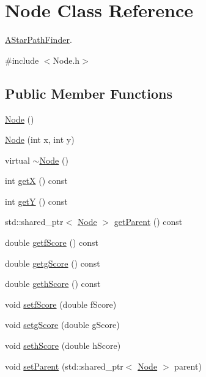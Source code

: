 \hypertarget{classNode}{}\section{Node Class Reference}
\label{classNode}


\hyperlink{classAStarPathFinder}{A\+Star\+Path\+Finder}.  




{\ttfamily \#include $<$Node.\+h$>$}

\subsection*{Public Member Functions}
\begin{DoxyCompactItemize}
\item 
\hyperlink{classNode_ad7a34779cad45d997bfd6d3d8043c75f}{Node} ()
\item 
\hyperlink{classNode_a23a19f53dfbb18fec58cdac90de3d144}{Node} (int x, int y)
\item 
virtual \hyperlink{classNode_aa0840c3cb5c7159be6d992adecd2097c}{$\sim$\+Node} ()
\item 
int \hyperlink{classNode_aa45b6294ee8c7aafdf5a1450f879c598}{getX} () const 
\item 
int \hyperlink{classNode_a81610ad138e2ac2cca79603032aaafc1}{getY} () const 
\item 
std\+::shared\+\_\+ptr$<$ \hyperlink{classNode}{Node} $>$ \hyperlink{classNode_a707ec5f7e95ba42c15c263adc1ee70fe}{get\+Parent} () const 
\item 
double \hyperlink{classNode_af2d1b4d63492be819be4566bf23c2215}{getf\+Score} () const 
\item 
double \hyperlink{classNode_a6d96ac905adeaa43c9ec4cef44f5617b}{getg\+Score} () const 
\item 
double \hyperlink{classNode_a04d718022d49c317f12ecbe2829642e7}{geth\+Score} () const 
\item 
void \hyperlink{classNode_a5c3c70e327b9e358435ef1689eeb81b0}{setf\+Score} (double f\+Score)
\item 
void \hyperlink{classNode_a00e41993c05f5bfc5db6d98a58680c51}{setg\+Score} (double g\+Score)
\item 
void \hyperlink{classNode_afc359dbe960036d705b2d68a697a416e}{seth\+Score} (double h\+Score)
\item 
void \hyperlink{classNode_a5889e5c01190f75a7074e00c76f6a68a}{set\+Parent} (std\+::shared\+\_\+ptr$<$ \hyperlink{classNode}{Node} $>$ parent)
\item 

\end{DoxyCompactItemize}
